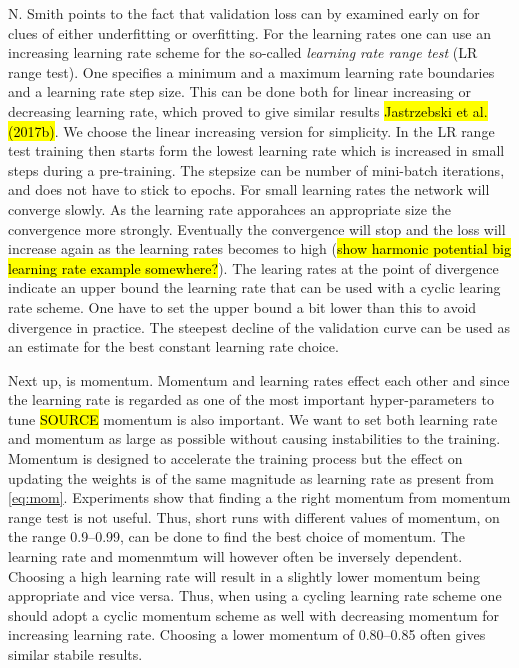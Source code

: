 N. Smith points to the fact that validation loss can by examined early on for
clues of either underfitting or overfitting. For the learning rates one can use
an increasing learning rate scheme for the so-called \textit{learning rate range
test} (LR range test). One specifies a minimum and a maximum learning rate
boundaries and a learning rate step size.  This can be done both for linear
increasing or decreasing learning rate, which proved to give similar results
\cite{smith2018disciplined} \hl{Jastrzebski et al. (2017b)}. We choose the
linear increasing version for simplicity. In the LR range test training then
starts form the lowest learning rate which is increased in small steps during a
pre-training. The stepsize can be number of mini-batch iterations, and does not
have to stick to epochs. For small learning rates the network will converge
slowly. As the learning rate apporahces an appropriate size the convergence more
strongly. Eventually the convergence will stop and the loss will increase again
as the learning rates becomes to high (\hl{show harmonic potential big learning
rate example somewhere?}). The learing rates at the point of divergence indicate an upper bound the learning rate that can be used with a cyclic learing rate scheme. One have to set the upper bound a bit lower than this to avoid divergence in practice. The steepest decline of the validation curve can be used as an estimate for the best constant learning rate choice. 

Next up, is momentum. Momentum and learning rates effect each other and since
the learning rate is regarded as one of the most important hyper-parameters to
tune \hl{SOURCE} momentum is also important. We want to set both learning rate
and momentum as large as possible without causing instabilities to the training.
Momentum is designed to accelerate the training process but the effect on
updating the weights is of the same magnitude as learning rate as present from
\cref{eq:mom}. Experiments show that finding a the right momentum from momentum
range test is not useful. Thus, short runs with different values of momentum, on
the range 0.9--0.99, can be done to find the best choice of momentum. The
learning rate and momenmtum will however often be inversely dependent. Choosing
a high learning rate will result in a slightly lower momentum being appropriate
and vice versa. Thus, when using a cycling learning rate scheme one should adopt
a cyclic momentum scheme as well with decreasing momentum for increasing
learning rate. Choosing a lower momentum of 0.80--0.85 often gives similar stabile results.

